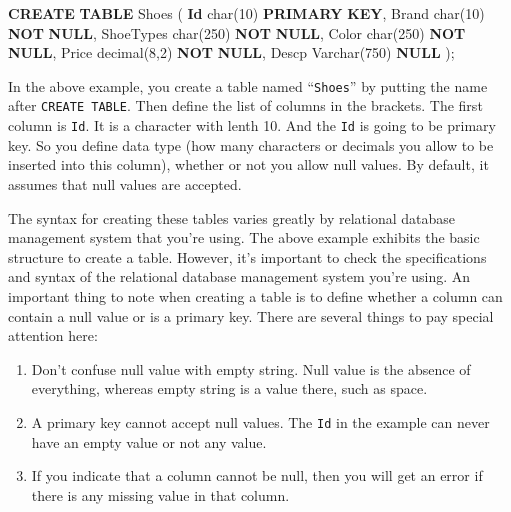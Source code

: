 \documentclass[]{book}
\newenvironment{Shaded}{\begin{snugshade}}{\end{snugshade}}
\newcommand{\KeywordTok}[1]{\textcolor[rgb]{0.13,0.29,0.53}{\textbf{{#1}}}}
\newcommand{\DataTypeTok}[1]{\textcolor[rgb]{0.13,0.29,0.53}{{#1}}}
\newcommand{\DecValTok}[1]{\textcolor[rgb]{0.00,0.00,0.81}{{#1}}}
\newcommand{\NormalTok}[1]{{#1}}
\providecommand{\tightlist}{%
  \setlength{\itemsep}{0pt}\setlength{\parskip}{0pt}}
\theoremstyle{definition}
\theoremstyle{definition}
\theoremstyle{remark}
\begin{document}
\begin{Shaded}
\begin{Highlighting}[]
\KeywordTok{CREATE} \KeywordTok{TABLE} \NormalTok{Shoes}
\NormalTok{(}
\KeywordTok{Id}     \DataTypeTok{char}\NormalTok{(}\DecValTok{10}\NormalTok{)     }\KeywordTok{PRIMARY} \KeywordTok{KEY}\NormalTok{,}
\NormalTok{Brand  }\DataTypeTok{char}\NormalTok{(}\DecValTok{10}\NormalTok{)     }\KeywordTok{NOT} \KeywordTok{NULL}\NormalTok{,}
\NormalTok{ShoeTypes  }\DataTypeTok{char}\NormalTok{(}\DecValTok{250}\NormalTok{)    }\KeywordTok{NOT} \KeywordTok{NULL}\NormalTok{,}
\NormalTok{Color  }\DataTypeTok{char}\NormalTok{(}\DecValTok{250}\NormalTok{)    }\KeywordTok{NOT} \KeywordTok{NULL}\NormalTok{,}
\NormalTok{Price  }\DataTypeTok{decimal}\NormalTok{(}\DecValTok{8}\NormalTok{,}\DecValTok{2}\NormalTok{) }\KeywordTok{NOT} \KeywordTok{NULL}\NormalTok{,}
\NormalTok{Descp  }\DataTypeTok{Varchar}\NormalTok{(}\DecValTok{750}\NormalTok{) }\KeywordTok{NULL}
\NormalTok{);}
\end{Highlighting}
\end{Shaded}

In the above example, you create a table named ``\texttt{Shoes}'' by
putting the name after \texttt{CREATE\ TABLE}. Then define the list of
columns in the brackets. The first column is \texttt{Id}. It is a
character with lenth 10. And the \texttt{Id} is going to be primary key.
So you define data type (how many characters or decimals you allow to be
inserted into this column), whether or not you allow null values. By
default, it assumes that null values are accepted.

The syntax for creating these tables varies greatly by relational
database management system that you're using. The above example exhibits
the basic structure to create a table. However, it's important to check
the specifications and syntax of the relational database management
system you're using. An important thing to note when creating a table is
to define whether a column can contain a null value or is a primary key.
There are several things to pay special attention here:

\begin{enumerate}
\def\labelenumi{\arabic{enumi}.}
\tightlist
\item
  Don't confuse null value with empty string. Null value is the absence
  of everything, whereas empty string is a value there, such as space.
\item
  A primary key cannot accept null values. The \texttt{Id} in the
  example can never have an empty value or not any value.
\item
  If you indicate that a column cannot be null, then you will get an
  error if there is any missing value in that column.
\end{enumerate}
\end{document}
